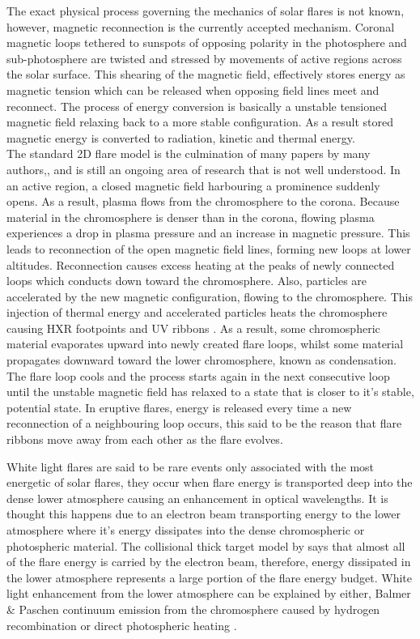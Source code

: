 \documentclass[11pt]{article}
\begin{document}
The exact physical process governing the mechanics of solar flares is not known, however, magnetic reconnection is the currently accepted mechanism. Coronal magnetic loops tethered to sunspots of opposing polarity in the photosphere and sub-photosphere are twisted and stressed by movements of active regions across the solar surface. This shearing of the magnetic field, effectively stores energy as magnetic tension which can be released when opposing field lines meet and reconnect. The process of energy conversion is basically a unstable tensioned magnetic field relaxing back to a more stable configuration. As a result stored magnetic energy is converted to radiation, kinetic and thermal energy\citep{1976SoPh...50...85K}.\\
The standard 2D flare model is the culmination of many papers by many authors,\citep{1964NASSP..50..451C, 1966Natur.211..695S, 1974SoPh...34..323H, 1976SoPh...50...85K}, and is still an ongoing area of research that is not well understood. In an active region, a closed magnetic field harbouring a prominence suddenly opens. As a result, plasma flows from the chromosphere to the corona. Because material in the chromosphere is denser than in the corona, flowing plasma experiences a drop in plasma pressure and an increase in magnetic pressure. This leads to reconnection of the open magnetic field lines, forming new loops at lower altitudes. Reconnection causes excess heating at the peaks of newly connected loops which conducts down toward the chromosphere. Also, particles are accelerated by the new magnetic configuration, flowing to the chromosphere. This injection of thermal energy and accelerated particles heats the chromosphere causing HXR footpoints \citep{1995ApJ...455..347A} and UV ribbons \citep{2009A&A...493..241F}. As a result, some chromospheric material evaporates upward into newly created flare loops, whilst some material propagates downward toward the lower chromosphere, known as condensation. The flare loop cools and the process starts again in the next consecutive loop until the unstable magnetic field has relaxed to a state that is closer to it's stable,  potential state. In eruptive flares, energy is released every time a new reconnection of a neighbouring loop occurs, this said to be the reason that flare ribbons move away from each other as the flare evolves. 

White light flares are said to be rare events only associated with the most energetic of solar flares, they occur when flare energy is transported deep into the dense lower atmosphere causing an enhancement in optical wavelengths. It is thought this happens due to an electron beam transporting energy to the lower atmosphere where it's energy dissipates into the dense chromospheric or photospheric material. The collisional thick target model by \cite{1971SoPh...18..489B} says that almost all of the flare energy is carried by the electron beam, therefore, energy dissipated in the lower atmosphere represents a large portion of the flare energy budget. White light enhancement from the lower atmosphere can be explained by either, Balmer \& Paschen continuum emission from the chromosphere caused by hydrogen recombination or direct photospheric heating \citep{2007ASPC..368..417D}.    
\end{document}
